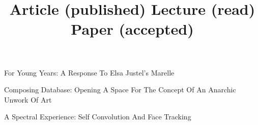 \title{ Article (published) }
\begin{position} 
For Young Years: A Response To Elsa Justel's Marelle
\end{position}

\title{ Lecture (read) }
\begin{position} 
Composing Database: Opening A Space For The Concept Of An Anarchic Unwork Of Art
\end{position}

\title{ Paper (accepted) }
\begin{position} 
A Spectral Experience: Self Convolution And Face Tracking
\end{position}
